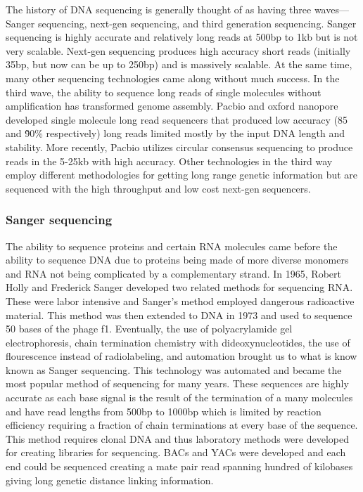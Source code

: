 \par{
The history of DNA sequencing is generally thought of as having three waves---Sanger sequencing, next-gen sequencing, and third generation sequencing. Sanger sequencing is highly accurate and relatively long reads at 500bp to 1kb but is not very scalable. Next-gen sequencing produces high accuracy short reads (initially 35bp, but now can be up to 250bp) and is massively scalable. At the same time, many other sequencing technologies came along without much success. In the third wave, the ability to sequence long reads of single molecules without amplification has transformed genome assembly. Pacbio and oxford nanopore developed single molecule long read sequencers that produced low accuracy (85 and \~90\% respectively) long reads limited mostly by the input DNA length and stability. More recently, Pacbio utilizes circular consensus sequencing to produce reads in the 5-25kb with high accuracy. Other technologies in the third way employ different methodologies for getting long range genetic information but are sequenced with the high throughput and low cost next-gen sequencers.
}

\subsubsection{Sanger sequencing}\label{section:sanger}

\par{
The ability to sequence proteins and certain RNA molecules came before the ability to sequence DNA due to proteins being made of more diverse monomers and RNA not being complicated by a complementary strand\cite{aminoacidsequence}\cite{sequenceofsequencers}. In 1965, Robert Holly and Frederick Sanger developed two related methods for sequencing RNA\cite{Holly1}\cite{Sanger1}. These were labor intensive and Sanger's method employed dangerous radioactive material. This method was then extended to DNA in 1973 and used to sequence 50 bases of the phage f1\cite{Sanger2}. Eventually, the use of polyacrylamide gel electrophoresis, chain termination chemistry with dideoxynucleotides, the use of flourescence instead of radiolabeling, and automation brought us to what is know known as Sanger sequencing\cite{Sanger3}. This technology was automated and became the most popular method of sequencing for many years\cite{Hunkapiller1991}. These sequences are highly accurate as each base signal is the result of the termination of a many molecules and have read lengths from 500bp to 1000bp which is limited by reaction efficiency requiring a fraction of chain terminations at every base of the sequence. This method requires clonal DNA and thus laboratory methods were developed for creating libraries for sequencing. BACs and YACs \cite{BACsYACs} were developed and each end could be sequenced creating a mate pair read spanning hundred of kilobases giving long genetic distance linking information.
}

